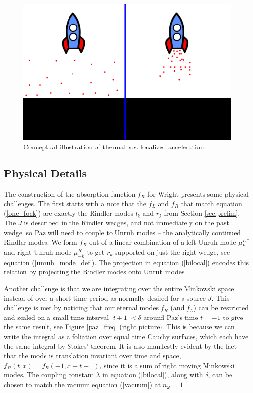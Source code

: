 \documentclass[12pt,a4paper]{article}
\begin{document}
\begin{figure}[h]
\centering
\includegraphics[scale=0.5]{rocket_inertial.png}
\caption{Conceptual illustration of thermal v.s. localized acceleration.}
\label{rocket_inertial}
\end{figure}

\subsection{Physical Details} \label{sec:drive_phy}

The construction of the absorption function $f_R$ for Wright presents some physical challenges. The first starts with a note that the $f_L$ and $f_R$ that match equation (\ref{one_fock}) are exactly the Rindler modes $l_k$ and $r_k$ from Section \ref{sec:prelim}. The $J$ is described in the Rindler wedges, and not immediately on the past wedge, so Paz will need to couple to Unruh modes -- the analytically continued Rindler modes.  We form $f_R$ out of a linear combination of a left Unruh mode $\mu^{L*}_{k}$ and right Unruh mode $\mu^R_{-k}$ to get $r_k$ supported on just the right wedge, see equation (\ref{unruh_mode_def}).  The projection in equation (\ref{bilocal}) encodes this relation by projecting the Rindler modes onto Unruh modes.

Another challenge is that we are integrating over the entire Minkowski space instead of over a short time period as normally desired for a source $J$.  This challenge is met by noticing that our eternal modes $f_R$ (and $f_L$) can be restricted and scaled on a small time interval $|t + 1| < \delta$ around Paz's time $t=-1$ to give the same result, see Figure \ref{paz_freq} (right picture). This is because we can write the integral as a foliation over equal time Cauchy surfaces, which each have the same integral by Stokes' theorem. It is also manifestly evident by the fact that the mode is translation invariant over time and space, $f_R(t,x) = f_R(-1,x+t+1)$, since it is a sum of right moving Minkowski modes. The coupling constant $\lambda$ in equation (\ref{bilocal}), along with $\delta$, can be chosen to match the vacuum equation (\ref{vacuum}) at $n_\omega = 1$.
\end{document}
